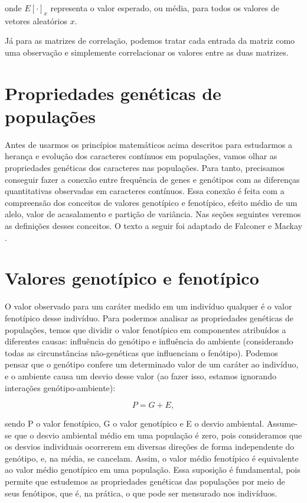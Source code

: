 \documentclass[portuges,]{tufte-handout}
\begin{document}
onde $E[\cdot]_x$ representa o valor esperado, ou média, para todos os
valores de vetores aleatórios $x$.

Já para as matrizes de correlação, podemos tratar cada entrada da matriz
como uma observação e simplemente correlacionar os valores entre as duas
matrizes.

\section{Propriedades genéticas de
populações}\label{propriedades-genuxe9ticas-de-populauxe7uxf5es}

Antes de usarmos os princípios matemáticos acima descritos para
estudarmos a herança e evolução dos caracteres contínuos em populações,
vamos olhar as propriedades genéticas dos caracteres nas populações.
Para tanto, precisamos conseguir fazer a conexão entre frequência de
genes e genótipos com as diferenças quantitativas observadas em
caracteres contínuos. Essa conexão é feita com a compreensão dos
conceitos de valores genotípico e fenotípico, efeito médio de um alelo,
valor de acasalamento e partição de variância. Nas seções seguintes
veremos as definições desses conceitos. O texto a seguir foi adaptado de
Falconer e Mackay \cite{Falconer1996}.

\section{Valores genotípico e
fenotípico}\label{valores-genotuxedpico-e-fenotuxedpico}

O valor observado para um caráter medido em um indivíduo qualquer é o
valor fenotípico desse indivíduo. Para podermos analisar as propriedades
genéticas de populações, temos que dividir o valor fenotípico em
componentes atribuídos a diferentes causas: influência do genótipo e
influência do ambiente (considerando todas as circunstâncias
não-genéticas que influenciam o fenótipo). Podemos pensar que o genótipo
confere um determinado valor de um caráter ao indivíduo, e o ambiente
causa um desvio desse valor (ao fazer isso, estamos ignorando interações
genótipo-ambiente):

\[
P = G + E,
\]

sendo P o valor fenotípico, G o valor genotípico e E o desvio ambiental.
Assume-se que o desvio ambiental médio em uma população é zero, pois
consideramos que os desvios individuais ocorrerem em diversas direções
de forma independente do genótipo, e, na média, se cancelam. Assim, o
valor médio fenotípico é equivalente ao valor médio genotípico em uma
população. Essa suposição é fundamental, pois permite que estudemos as
propriedades genéticas das populações por meio de seus fenótipos, que é,
na prática, o que pode ser mensurado nos indivíduos.
\end{document}
